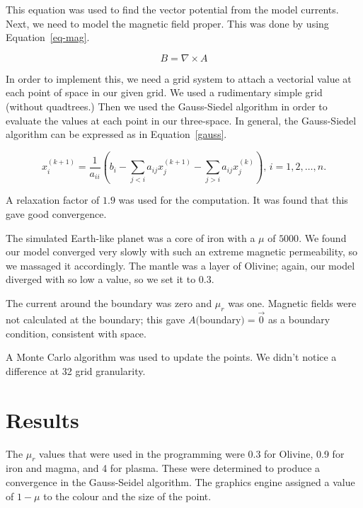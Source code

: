 \documentclass[twocolumn]{article}
\begin{document}
This equation was used to find the vector potential from the model
currents. Next, we need to model the magnetic field proper. This was
done by using Equation~\ref{eq-mag}\cite{griffiths}.

\begin{equation}
B = \nabla \times A
\label{eq-mag}
\end{equation}

In order to implement this, we need a grid system to attach a
vectorial value at each point of space in our given grid. We used
a rudimentary simple grid (without quadtrees.) Then we used the
Gauss-Siedel\cite{jackson} algorithm in order to evaluate the values
at each point in our three-space. In general, the Gauss-Siedel algorithm
can be expressed as in Equation~\ref{gauss}.

{\footnotesize \begin{equation}
x^{(k+1)}_i  = \frac{1}{a_{ii}}
\left(b_i - \sum_{j<i}a_{ij}x^{(k+1)}_j-
\sum_{j>i}a_{ij}x^{(k)}_j\right),\, i=1,2,\ldots,n.
\label{gauss}
\end{equation}}

A relaxation factor of $1.9$ was used for the computation. It was found
that this gave good convergence.

The simulated Earth-like planet was a core of iron with a $\mu$ of
$5000$\cite{taylor}. We found our model converged very slowly with such
an extreme magnetic permeability, so we massaged it accordingly. The
mantle was a layer of Olivine\cite{gunn}\cite{iwa}; again, our model
diverged with so low a value, so we set it to $0.3$.

The current around the boundary was zero and $\mu_{r}$ was one. Magnetic
fields were not calculated at the boundary; this gave $A($boundary$) =
\vec{0}$ as a boundary condition, consistent with space.

A Monte Carlo algorithm was used to update the points. We didn't notice
a difference at 32 grid granularity.

\section{Results}

The $\mu_{r}$ values that were used in the programming were 0.3 for Olivine,
0.9 for iron and magma, and 4 for plasma. These were determined to produce a
convergence in the Gauss-Seidel algorithm. The graphics engine assigned
a value of $1 - \mu$ to the colour and the size of the point.
\end{document}
